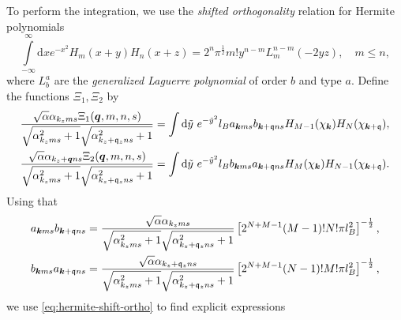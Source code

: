 To perform the integration, we use the \emph{shifted orthogonality} relation for Hermite polynomials~\cite[Eq. (7.377)]{gradshteinTableIntegralsSeries2015}
\begin{equation}
  \label{eq:hermite-shift-ortho}
  \int\limits_{-\infty }^{\infty } \mathrm{d}x
  e^{-x^2} H_m(x+y) H_n(x+z)
  = 2^n \pi^{\frac{1}{2}} m! y^{n-m} L^{n-m}_m(-2yz), \quad m\leq n,
\end{equation}
where \(L^{a}_{b}\) are the \emph{generalized Laguerre polynomial} of order \(b\) and type \(a\).
Define the functions \( \Xi_1, \Xi_2 \) by
\begin{align}
  \label{eq:101}
  \frac{ \sqrt{\alpha } \alpha_{k_z m s} \Xi_1 ( \bm{q}, m, n, s )}{
    \sqrt{\alpha_{k_z m s}^2 + 1}
    \sqrt{\alpha_{k_z + \mathfrak{q}_z n s} ^2 + 1}
  }
  &=
  \int \mathrm{d} \tilde{y}
  ~e^{-\tilde{y}^2}
  l_{B}
  a_{\bm{k} m s} b_{\bm{k} + \mathfrak{q} ns}
  H_{M-1} (\chi_{\bm{k}})
  H_N ( \chi _{\bm{k} + \mathfrak{q}} ),\\
  \label{eq:102}
  \frac{ \sqrt{\alpha } \alpha_{k_z + \bm{q} n s} \Xi_2 ( \bm{q}, m, n, s )}{
    \sqrt{\alpha_{k_z m s}^2 + 1}
    \sqrt{\alpha_{k_z + \mathfrak{q}_z n s} ^2 + 1}
  }
  &=
  \int \mathrm{d} \tilde{y}
  ~e^{-\tilde{y}^2}
  l_{B}
  b_{\bm{k} m s} a_{\bm{k} + \mathfrak{q} ns}
  H_{M} (\chi_{\bm{k}})
  H_{N-1} ( \chi _{\bm{k} + \mathfrak{q}} ).
\end{align}
Using that
\begin{align}
  a_{\bm{k} m s} b_{\bm{k} +\mathfrak{q} ns}
  &=
    \frac{ \sqrt{\alpha} \alpha_{k_z m s}}{\sqrt{\alpha_{k_z m s} ^2 + 1} \sqrt{\alpha_{k_z + \mathfrak{q}_z ns} ^2  + 1}  }
    \left[
    2^{N+M-1} (M-1)! N! \pi l_{B}^2
    \right  ]^{-\frac{1}{2}},\\
  b_{\bm{k} m s} a_{\bm{k} +\mathfrak{q} ns}
  &=
    \frac{\sqrt{\alpha} \alpha_{k_z + \mathfrak{q}_z n s}}{\sqrt{\alpha_{k_z m s} ^2 + 1} \sqrt{\alpha_{k_z + \mathfrak{q}_z ns} ^2  + 1}  }
    \left[
    2^{N+M-1} (N-1)! M! \pi l_{B}^2
    \right  ]^{-\frac{1}{2}},
\end{align}
we use \cref{eq:hermite-shift-ortho} to find explicit expressions
